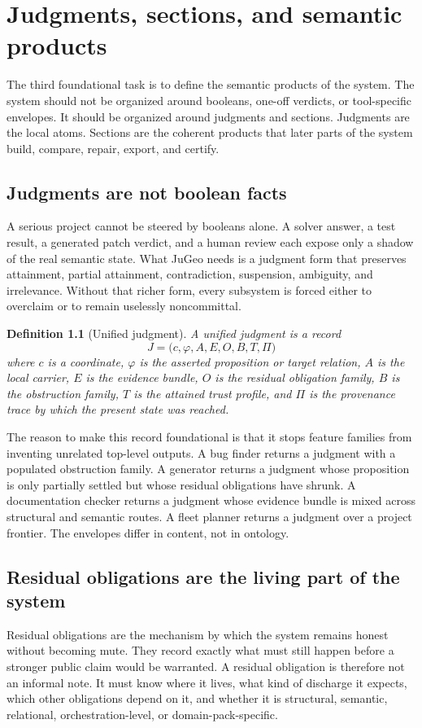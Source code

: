 \documentclass[11pt]{report}
\newtheorem{definition}{Definition}[chapter]
\begin{document}
\chapter{Judgments, sections, and semantic products}
The third foundational task is to define the semantic products of the system. The system should not be organized around booleans, one-off verdicts, or tool-specific envelopes. It should be organized around judgments and sections. Judgments are the local atoms. Sections are the coherent products that later parts of the system build, compare, repair, export, and certify.
\section{Judgments are not boolean facts}
A serious project cannot be steered by booleans alone. A solver answer, a test result, a generated patch verdict, and a human review each expose only a shadow of the real semantic state. What JuGeo needs is a judgment form that preserves attainment, partial attainment, contradiction, suspension, ambiguity, and irrelevance. Without that richer form, every subsystem is forced either to overclaim or to remain uselessly noncommittal.

\begin{definition}[Unified judgment]
A unified judgment is a record
\[
J=\bigl(c,\varphi,A,E,O,B,T,\Pi\bigr)
\]
where $c$ is a coordinate, $\varphi$ is the asserted proposition or target relation, $A$ is the local carrier, $E$ is the evidence bundle, $O$ is the residual obligation family, $B$ is the obstruction family, $T$ is the attained trust profile, and $\Pi$ is the provenance trace by which the present state was reached.
\end{definition}

The reason to make this record foundational is that it stops feature families from inventing unrelated top-level outputs. A bug finder returns a judgment with a populated obstruction family. A generator returns a judgment whose proposition is only partially settled but whose residual obligations have shrunk. A documentation checker returns a judgment whose evidence bundle is mixed across structural and semantic routes. A fleet planner returns a judgment over a project frontier. The envelopes differ in content, not in ontology.
\section{Residual obligations are the living part of the system}
Residual obligations are the mechanism by which the system remains honest without becoming mute. They record exactly what must still happen before a stronger public claim would be warranted. A residual obligation is therefore not an informal note. It must know where it lives, what kind of discharge it expects, which other obligations depend on it, and whether it is structural, semantic, relational, orchestration-level, or domain-pack-specific.
\end{document}
